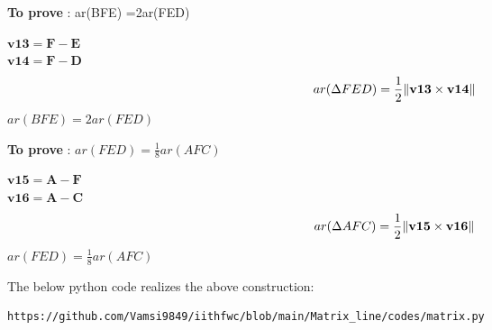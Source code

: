 \documentclass[10pt, a4paper]{article}
\let\vec\mathbf
\begin{document}
 \textbf{To prove} : ar(BFE) =2ar(FED)
\begin{center}
$\vec{v13}=\vec{F-E}$\\
$\vec{v14}=\vec{F-D}$\\
	\begin{equation}
 ar(\Delta FED) =\frac{1}{2}\norm{\vec{v13}\times\vec{v14}}
	\end{equation}
 $ar(BFE) =2ar(FED)$   
\end{center}
\textbf{To prove} : $ar(FED) =\frac{1}{8} ar(AFC)$
\begin{center}
$\vec{v15}=\vec{A-F}$\\
$\vec{v16}=\vec{A-C}$\\
	\begin{equation}
ar(\Delta AFC) =\frac{1}{2}\norm{\vec{v15}\times\vec{v16}}
	\end{equation}
 $ar(FED) =\frac{1}{8} ar(AFC)$   
\end{center}
The below python code realizes the above construction: 
\begin{lstlisting}
https://github.com/Vamsi9849/iithfwc/blob/main/Matrix_line/codes/matrix.py
\end{lstlisting}   

\end{document}
